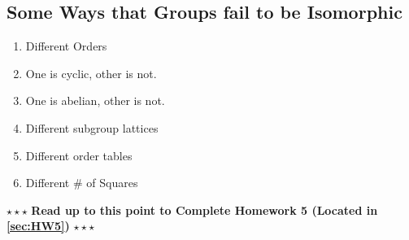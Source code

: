 \subsection*{Some Ways that Groups fail to be Isomorphic}
\begin{enumerate}
    \item Different Orders
    \item One is cyclic, other is not.
    \item One is abelian, other is not.
    \item Different subgroup lattices
    \item Different order tables
    \item Different \# of Squares
\end{enumerate}
\begin{tcolorbox}
    \begin{center}
        $\star\star\star$ \textbf{Read up to this point to Complete Homework 5 (Located in
        \ref{sec:HW5})} $\star\star\star$
    \end{center}
    \end{tcolorbox}
\newpage
\setcounter{dummy}{0}
